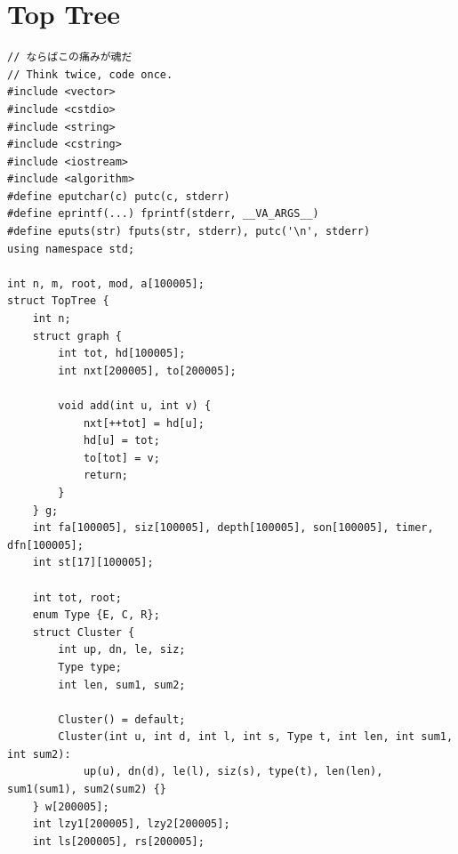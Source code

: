\section{Top Tree}

\begin{verbatim}
// ならばこの痛みが魂だ
// Think twice, code once.
#include <vector>
#include <cstdio>
#include <string>
#include <cstring>
#include <iostream>
#include <algorithm>
#define eputchar(c) putc(c, stderr)
#define eprintf(...) fprintf(stderr, __VA_ARGS__)
#define eputs(str) fputs(str, stderr), putc('\n', stderr)
using namespace std;

int n, m, root, mod, a[100005];
struct TopTree {
    int n;
    struct graph {
        int tot, hd[100005];
        int nxt[200005], to[200005];

        void add(int u, int v) {
            nxt[++tot] = hd[u];
            hd[u] = tot;
            to[tot] = v;
            return;
        }
    } g;
    int fa[100005], siz[100005], depth[100005], son[100005], timer, dfn[100005];
    int st[17][100005];

    int tot, root;
    enum Type {E, C, R};
    struct Cluster {
        int up, dn, le, siz;
        Type type;
        int len, sum1, sum2;

        Cluster() = default;
        Cluster(int u, int d, int l, int s, Type t, int len, int sum1, int sum2):
            up(u), dn(d), le(l), siz(s), type(t), len(len), sum1(sum1), sum2(sum2) {}
    } w[200005];
    int lzy1[200005], lzy2[200005];
    int ls[200005], rs[200005];


\end{verbatim}
